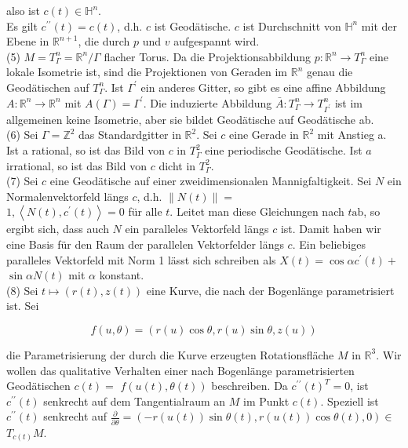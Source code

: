 \documentclass[10pt]{article}
\begin{document}
also ist $c(t) \in \mathbb{H}^{n}$.\\
Es gilt $c^{\prime \prime}(t)=c(t)$, d.h. $c$ ist Geodätische. $c$ ist Durchschnitt von $\mathbb{H}^{n}$ mit der Ebene in $\mathbb{R}^{n+1}$, die durch $p$ und $v$ aufgespannt wird.\\
(5) $M=T_{\Gamma}^{n}=\mathbb{R}^{n} / \Gamma$ flacher Torus. Da die Projektionsabbildung $p: \mathbb{R}^{n} \rightarrow T_{\Gamma}^{n}$ eine lokale Isometrie ist, sind die Projektionen von Geraden im $\mathbb{R}^{n}$ genau die Geodätischen auf $T_{\Gamma}^{n}$. Ist $\Gamma^{\prime}$ ein anderes Gitter, so gibt es eine affine Abbildung $A: \mathbb{R}^{n} \rightarrow \mathbb{R}^{n}$ mit $A(\Gamma)=\Gamma^{\prime}$. Die induzierte Abbildung $\bar{A}: T_{\Gamma}^{n} \rightarrow T_{\Gamma^{\prime}}^{n}$ ist im allgemeinen keine Isometrie, aber sie bildet Geodätische auf Geodätische ab.\\
(6) Sei $\Gamma=\mathbb{Z}^{2}$ das Standardgitter in $\mathbb{R}^{2}$. Sei $c$ eine Gerade in $\mathbb{R}^{2}$ mit Anstieg a. Ist a rational, so ist das Bild von $c$ in $T_{\Gamma}^{2}$ eine periodische Geodätische. Ist $a$ irrational, so ist das Bild von $c$ dicht in $T_{\Gamma}^{2}$.\\
(7) Sei $c$ eine Geodätische auf einer zweidimensionalen Mannigfaltigkeit. Sei $N$ ein Normalenvektorfeld längs $c$, d.h. $\|N(t)\|=$\\
$1,\left\langle N(t), c^{\prime}(t)\right\rangle=0$ für alle $t$. Leitet man diese Gleichungen nach $t \mathrm{ab}$, so ergibt sich, dass auch $N$ ein paralleles Vektorfeld längs $c$ ist. Damit haben wir eine Basis für den Raum der parallelen Vektorfelder längs $c$. Ein beliebiges paralleles Vektorfeld mit Norm 1 lässt sich schreiben als $X(t)=\cos \alpha c^{\prime}(t)+$ $\sin \alpha N(t)$ mit $\alpha$ konstant.\\
(8) Sei $t \mapsto(r(t), z(t))$ eine Kurve, die nach der Bogenlänge parametrisiert ist. Sei

$$
f(u, \theta)=(r(u) \cos \theta, r(u) \sin \theta, z(u))
$$

die Parametrisierung der durch die Kurve erzeugten Rotationsfläche $M$ in $\mathbb{R}^{3}$. Wir wollen das qualitative Verhalten einer nach Bogenlänge parametrisierten Geodätischen $c(t)=$ $f(u(t), \theta(t))$ beschreiben. Da $c^{\prime \prime}(t)^{T}=0$, ist $c^{\prime \prime}(t)$ senkrecht auf dem Tangentialraum an $M$ im Punkt $c(t)$. Speziell ist $c^{\prime \prime}(t)$ senkrecht auf $\frac{\partial}{\partial \theta}=(-r(u(t)) \sin \theta(t), r(u(t)) \cos \theta(t), 0) \in$ $T_{c(t)} M$.
\end{document}
